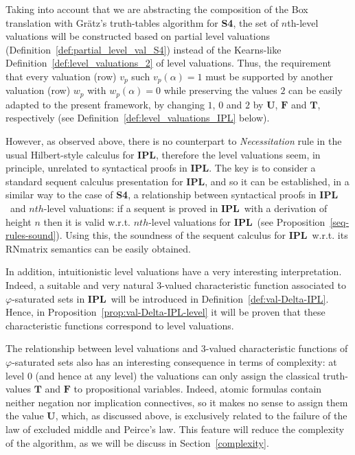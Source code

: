 \documentclass[12pt]{article}
\newcommand{\bT}{\mathbf{T}}
\newcommand{\bU}{\mathbf{U}}
\newcommand{\bF}{\mathbf{F}}
\newcommand{\ipl}{\ensuremath{\mathbf{IPL}}}
\newcommand{\sfo}{\textbf{S4}}
\begin{document}
Taking into account that we are abstracting the composition of the Box translation with Gr\"atz's truth-tables algorithm for \sfo, the set of $n$th-level valuations will be constructed based on partial level valuations (Definition~\ref{def:partial_level_val_S4}) instead of the Kearns-like Definition~\ref{def:level_valuations_2} of level valuations.  Thus, the requirement that every valuation (row) $v_p$ such $v_p(\alpha)=1$ must be supported by another valuation (row) $w_p$ with $w_p(\alpha)=0$ while preserving the values $2$ can be easily adapted to the present framework, by changing $1$, $0$ and $2$ by $\bU$, $\bF$ and $\bT$, respectively (see Definition~\ref{def:level_valuations_IPL} below). 

However, as observed above, there is no counterpart to {\em Necessitation} rule in the usual Hilbert-style calculus for \ipl, therefore the level valuations seem, in principle, unrelated to syntactical proofs in \ipl. The key is to consider a standard sequent calculus presentation for \ipl, and so it can be established, in a similar way to the case of \sfo, a relationship between syntactical proofs in \ipl\ and $nth$-level valuations: if a sequent is proved in \ipl\  with a derivation of height $n$ then it is valid w.r.t. $nth$-level valuations for \ipl\ (see Proposition~\ref{seq-rules-sound}). Using this, the soundness of the sequent calculus for \ipl\ w.r.t. its RNmatrix semantics can be easily obtained.

In addition, intuitionistic level valuations have a very interesting interpretation. Indeed, a suitable and very natural $3$-valued characteristic function associated to $\varphi$-saturated sets in \ipl\ will be introduced in  Definition~\ref{def:val-Delta-IPL}. Hence, in Proposition~\ref{prop:val-Delta-IPL-level} it will be proven that these characteristic functions correspond to level valuations.

The relationship between level valuations and $3$-valued characteristic functions of $\varphi$-saturated sets also has an interesting consequence in terms of complexity: at level $0$ (and hence at any level) the valuations can only assign the classical truth-values $\bT$ and $\bF$ to propositional variables. Indeed, atomic formulas contain neither negation nor implication connectives, so it makes no sense to assign them the value $\bU$, which, as discussed above, is exclusively related to the failure of the law of excluded middle and Peirce's law. This feature will reduce the complexity of the algorithm, as we will be discuss in Section~\ref{complexity}.
\end{document}
